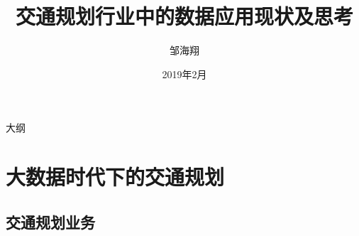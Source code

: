 \documentclass{beamerthemeMono}
\begin{document}
\title[交通规划行业中的数据应用现状及思考]%
{\heiti \xiaoerhao 交通规划行业中的数据应用现状及思考}


\author[邹海翔] %
{\xiaosihao 邹海翔}
\date{\xiaosihao 2019年2月}





\begin{frame}[plain]
  \titlepage
\end{frame}


\begin{frame}{大纲}{}
   {\tableofcontents[hideallsubsections]}
\end{frame}


\section{大数据时代下的交通规划}

\subsection{交通规划业务}
\end{document}
